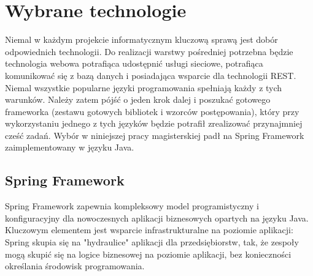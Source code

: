 
\section{Wybrane technologie}
\label{sec:technologies}

Niemal w każdym projekcie informatycznym kluczową sprawą jest dobór odpowiednich technologii. Do realizacji warstwy pośredniej potrzebna będzie technologia webowa potrafiąca udostępnić usługi sieciowe, potrafiąca komunikować się z bazą danych i posiadająca wsparcie dla technologii REST. Niemal wszystkie popularne języki programowania spełniają każdy z tych warunków. Należy zatem pójść o jeden krok dalej i poszukać gotowego frameworka (zestawu gotowych bibliotek i wzorców postępowania), który przy wykorzystaniu jednego z tych języków będzie potrafił zrealizować przynajmniej cześć zadań. Wybór w niniejszej pracy magisterskiej padł na Spring Framework zaimplementowany w języku Java. 

\subsection{Spring Framework  }
Spring Framework zapewnia kompleksowy model programistyczny i konfiguracyjny dla nowoczesnych aplikacji biznesowych opartych na języku Java. Kluczowym elementem jest wsparcie infrastrukturalne  na poziomie aplikacji: Spring skupia się na "hydraulice" aplikacji dla przedsiębiorstw, tak, że zespoły mogą skupić się na logice biznesowej na poziomie aplikacji, bez konieczności określania środowisk programowania. ~\cite{springFramework}

